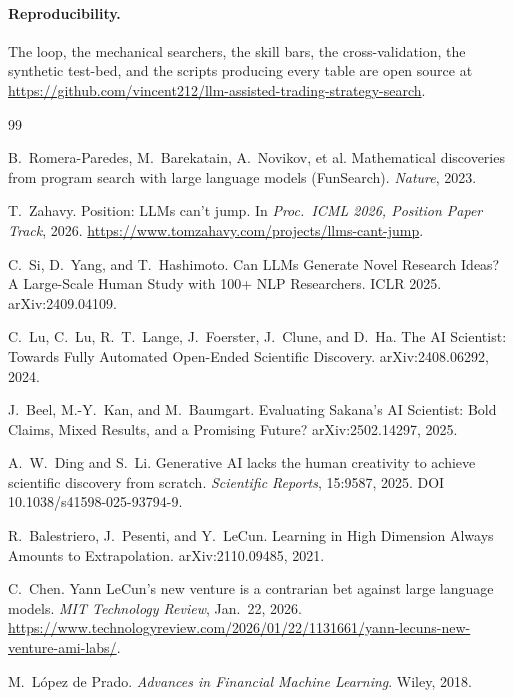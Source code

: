\documentclass[11pt]{article}
\begin{document}
\paragraph{Reproducibility.} The loop, the mechanical searchers, the skill bars, the
cross-validation, the synthetic test-bed, and the scripts producing every table are open source at
\url{https://github.com/vincent212/llm-assisted-trading-strategy-search}.


\begin{thebibliography}{99}

 B.~Romera-Paredes, M.~Barekatain, A.~Novikov, et al.
\newblock Mathematical discoveries from program search with large language models (FunSearch).
\newblock \emph{Nature}, 2023.

 T.~Zahavy.
\newblock Position: LLMs can't jump. In \emph{Proc.\ ICML 2026, Position Paper Track}, 2026.
\newblock \url{https://www.tomzahavy.com/projects/llms-cant-jump}.

 C.~Si, D.~Yang, and T.~Hashimoto.
\newblock Can LLMs Generate Novel Research Ideas? A Large-Scale Human Study with 100+ NLP Researchers.
\newblock ICLR 2025. arXiv:2409.04109.

 C.~Lu, C.~Lu, R.~T.~Lange, J.~Foerster, J.~Clune, and D.~Ha.
\newblock The AI Scientist: Towards Fully Automated Open-Ended Scientific Discovery.
\newblock arXiv:2408.06292, 2024.

 J.~Beel, M.-Y.~Kan, and M.~Baumgart.
\newblock Evaluating Sakana's AI Scientist: Bold Claims, Mixed Results, and a Promising Future?
\newblock arXiv:2502.14297, 2025.

 A.~W.~Ding and S.~Li.
\newblock Generative AI lacks the human creativity to achieve scientific discovery from scratch.
\newblock \emph{Scientific Reports}, 15:9587, 2025. DOI 10.1038/s41598-025-93794-9.

 R.~Balestriero, J.~Pesenti, and Y.~LeCun.
\newblock Learning in High Dimension Always Amounts to Extrapolation. arXiv:2110.09485, 2021.

 C.~Chen.
\newblock Yann LeCun's new venture is a contrarian bet against large language models.
\newblock \emph{MIT Technology Review}, Jan.~22, 2026.
\newblock \url{https://www.technologyreview.com/2026/01/22/1131661/yann-lecuns-new-venture-ami-labs/}.

 M.~L\'opez de Prado.
\newblock \emph{Advances in Financial Machine Learning}. Wiley, 2018.


\end{thebibliography}
\end{document}
